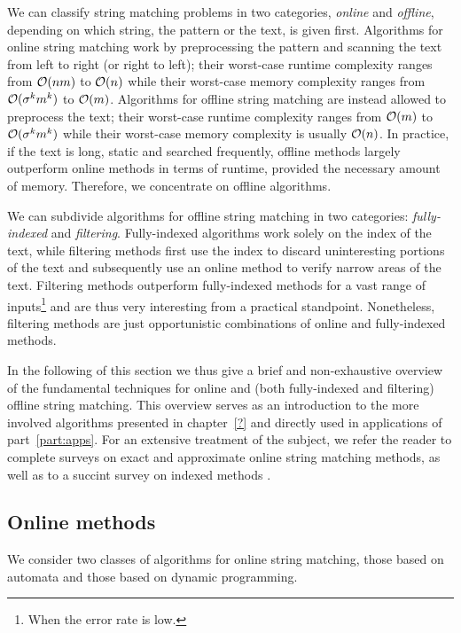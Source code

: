 We can classify string matching problems in two categories, \emph{online} and \emph{offline}, depending on which string, the pattern or the text, is given first.
Algorithms for online string matching work by preprocessing the pattern and scanning the text from left to right (or right to left); their worst-case runtime complexity ranges from $\mathcal{O}(nm)$ to $\mathcal{O}(n)$ while their worst-case memory complexity ranges from $\mathcal{O}(\sigma^k m^k)$ to $\mathcal{O}(m)$.
Algorithms for offline string matching are instead allowed to preprocess the text; their worst-case runtime complexity ranges from $\mathcal{O}(m)$ to $\mathcal{O}(\sigma^k m^k)$ while their worst-case memory complexity is usually $\mathcal{O}(n)$.
In practice, if the text is long, static and searched frequently, offline methods largely outperform online methods in terms of runtime, provided the necessary amount of memory. Therefore, we concentrate on offline algorithms.

We can subdivide algorithms for offline string matching in two categories: \emph{fully-indexed} and \emph{filtering}.
Fully-indexed algorithms work solely on the index of the text, while filtering methods first use the index to discard uninteresting portions of the text and subsequently use an online method to verify narrow areas of the text.
Filtering methods outperform fully-indexed methods for a vast range of inputs\footnote{When the error rate is low.} and are thus very interesting from a practical standpoint. Nonetheless, filtering methods are just opportunistic combinations of online and fully-indexed methods.

In the following of this section we thus give a brief and non-exhaustive overview of the fundamental techniques for online and (both fully-indexed and filtering) offline string matching.
This overview serves as an introduction to the more involved algorithms presented in chapter~\ref{?} and directly used in applications of part~\ref{part:apps}.
For an extensive treatment of the subject, we refer the reader to complete surveys on exact \citep{Faro2013} and approximate \citep{Navarro2001b} online string matching methods, as well as to a succint survey on indexed methods \citep{Navarro2001}.


\subsection{Online methods}

We consider two classes of algorithms for online string matching, those based on automata and those based on dynamic programming.

